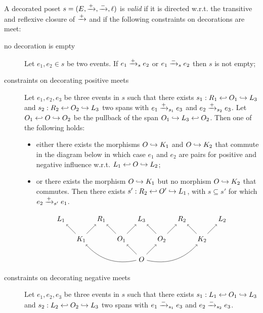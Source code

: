 \begin{definition}
  \label{def:constraints_poset}
  A decorated poset $s = (E,\mathrel{\xrightarrow{+}},\mathrel{\xrightarrow{-}},\ell)$ is \emph{valid} if it is directed w.r.t. the transitive and reflexive closure of $\mathrel{\xrightarrow{+}}$ and if the following constraints on decorations are meet:
  \begin{description}
  \item[no decoration is empty]
    Let $e_1,e_2\in s$ be two events. If $e_1\mathrel{\xrightarrow{+}}_{s} e_2$ or $e_1\mathrel{\xrightarrow{-}}_{s} e_2$ then $s$ is not empty;
  \item[constraints on decorating positive meets]
    Let $e_1,e_2,e_3$ be three events in $s$ such that there exists $s_1:R_1\hookleftarrow O_1\hookrightarrow L_3$ and $s_2:R_2\hookleftarrow O_2\hookrightarrow L_3$ two spans with $e_1\mathrel{\xrightarrow{+}}_{s_1} e_3$ and $e_2\mathrel{\xrightarrow{+}}_{s_2} e_3$.
    Let $O_1\hookleftarrow O\hookrightarrow O_2$ be the pullback of the span $O_1\hookrightarrow L_3 \hookleftarrow O_2$. Then one of the following holds:
    \begin{itemize}
    \item either there exists the morphisms $O\hookrightarrow K_1$ and $O\hookrightarrow K_2$ that commute in the diagram below in which case $e_1$ and $e_2$ are pairs for positive and negative influence w.r.t. $L_1\hookleftarrow O\hookrightarrow L_2$;
    \item or there exists the morphism $O\hookrightarrow K_1$ but no morphism $O\hookrightarrow K_2$ that commutes. Then there exists $s':R_2\hookleftarrow O'\hookrightarrow L_1$, with $s\subseteq s'$ for which $e_2\mathrel{\xrightarrow{+}}_{s'} e_1$.
    \end{itemize}
   \[
    \begin{tikzpicture} %
      \node (o) at (0,-1) {\(O\)};
      \node (r3) at (0,1) {\(L_3\)};
      \node (o1) at (-1,0) {\(O_1\)};
      \node (o2) at (1,0) {\(O_2\)};
      \node (r1) at (-2,1) {\(R_1\)};
      \node (r2) at (2,1) {\(R_2\)};
      \node (l1) at (-4,1) {\(L_1\)};
      \node (l2) at (4,1) {\(L_2\)};
      \node (k1) at (-3,0) {\(K_1\)};
      \node (k2) at (3,0) {\(K_2\)};
      \draw [->] (o) -- (o1);
      \draw [->] (o) -- (o2);
      \draw [->] (o1) -- (r3);
      \draw [->] (o2) -- (r3);
      \draw [->] (o1) -- (r1);
      \draw [->] (o2) -- (r2);
      \draw [->] (k1) -- (r1);
      \draw [->] (k2) -- (r2);
      \draw [->] (k1) -- (l1);
      \draw [->] (k2) -- (l2);
      \draw [->] (o) to [bend left] (k1);
      \draw [->] (o) to [bend right] (k2);
    \end{tikzpicture}
    \]
  \item[constraints on decorating negative meets]
    Let $e_1,e_2,e_3$ be three events in $s$ such that there exists $s_1:L_1\hookleftarrow O_1\hookrightarrow L_3$ and $s_2:L_2\hookleftarrow O_2\hookrightarrow L_3$ two spans with $e_1\mathrel{\xrightarrow{-}}_{s_1} e_3$ and $e_2\mathrel{\xrightarrow{-}}_{s_2} e_3$.

\end{description}
\end{definition}

